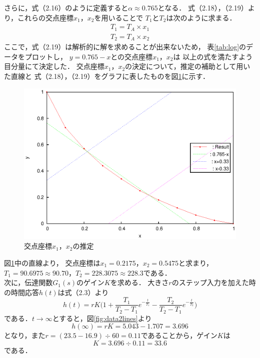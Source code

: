 \documentclass[11pt,a4paper]{jsarticle}
\begin{document}
    さらに，式（2.16）のように定義すると$\alpha \approx 0.765$となる．
    式（2.18），（2.19）より，これらの交点座標$x_1$，$x_2$を用いることで
    $T_1$と$T_2$は次のように求まる．
    \begin{eqnarray}
      T_1 = T_A \times x_1 \\
      T_2 = T_A \times x_2
    \end{eqnarray}
    ここで，式（2.19）は解析的に解を求めることが出来ないため，
    表\ref{tab:log}のデータをプロットし，
    $y = 0.765 - x$との交点座標$x_1$，$x_2$は
    以上の式を満たすよう目分量にて決定した．
    交点座標$x_1$，$x_2$の決定について，推定の補助として用いた直線と
    式（2.18），（2.19）をグラフに表したものを図\ref{fig:datalog}に示す．

    \begin{figure}[h]
      \begin{center}
        \includegraphics[width=0.9\hsize]{./fig/datalog.eps}
      \end{center}
      \caption{交点座標$x_1$，$x_2$の推定}
      \label{fig:datalog}
    \end{figure}

    図\ref{fig:datalog}中の直線より，
    交点座標は$x_1 = 0.2175$，$x_2 = 0.5475$と求まり，
    $T_1 = 90.6975 \approx 90.70$，$T_2 = 228.3075 \approx 228.3$である．\\

    次に，伝達関数$G_1(s)$のゲイン$K$を求める．
    大きさ$r$のステップ入力を加えた時の時間応答$h(t)$は式（2.3）より
    \begin{equation}
      h(t) = r K \biggl( 1 + \frac{T_1}{T_2 - T_1} e^{- \frac{t}{T_1}}
                           - \frac{T_2}{T_2 - T_1} e^{- \frac{t}{T_2}} \biggr)
    \end{equation}
    である．$t \rightarrow \infty$とすると，図\ref{fig:data2lines}より
    \begin{equation}
      h(\infty) = r K = 5.043 - 1.707 = 3.696
    \end{equation}
    となり，また$r = (23.5 -16.9) \div 60 = 0.11$であることから，ゲイン$K$は
    \begin{equation}
      K = 3.696 \div 0.11 = 33.6
    \end{equation}
    である．\\
\end{document}
